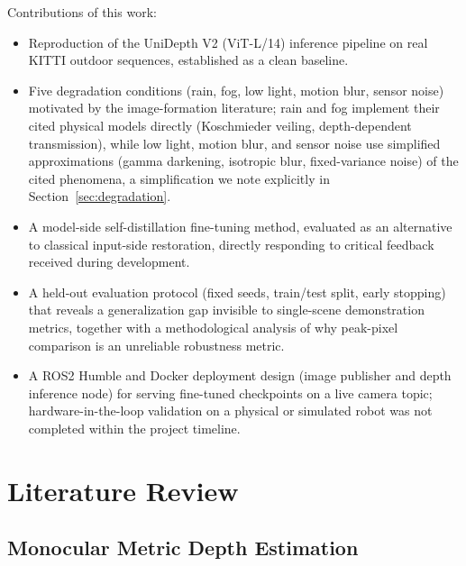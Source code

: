 \documentclass[conference]{IEEEtran}
\begin{document}
Contributions of this work:
\begin{itemize}
\item Reproduction of the UniDepth V2 (ViT-L/14) inference pipeline on real KITTI outdoor sequences, established as a clean baseline.
\item Five degradation conditions (rain, fog, low light, motion blur, sensor noise) motivated by the image-formation literature; rain and fog implement their cited physical models directly (Koschmieder veiling, depth-dependent transmission), while low light, motion blur, and sensor noise use simplified approximations (gamma darkening, isotropic blur, fixed-variance noise) of the cited phenomena, a simplification we note explicitly in Section~\ref{sec:degradation}.
\item A model-side self-distillation fine-tuning method, evaluated as an alternative to classical input-side restoration, directly responding to critical feedback received during development.
\item A held-out evaluation protocol (fixed seeds, train/test split, early stopping) that reveals a generalization gap invisible to single-scene demonstration metrics, together with a methodological analysis of why peak-pixel comparison is an unreliable robustness metric.
\item A ROS2 Humble and Docker deployment design (image publisher and depth inference node) for serving fine-tuned checkpoints on a live camera topic; hardware-in-the-loop validation on a physical or simulated robot was not completed within the project timeline.
\end{itemize}

\section{Literature Review}

\subsection{Monocular Metric Depth Estimation}
\end{document}
